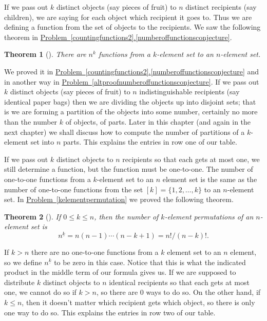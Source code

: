 \documentclass[10pt,]{book}
\theoremstyle{plain}
\newtheorem{theorem}{Theorem}[section]
\theoremstyle{definition}
\theoremstyle{definition}
\numberwithin{equation}{chapter}
\begin{document}
\par
If we pass out \(k\) distinct objects (say pieces of fruit) to \(n\) distinct recipients (say children), we are saying for each object which recipient it goes to. Thus we are defining a function from the set of objects to the recipients. We saw the following theorem in \hyperref[numberoffunctionsconjecture]{Problem~\ref{countingfunctions2}.\ref{numberoffunctionsconjecture}}.%
\begin{theorem}[{}]\label{theorem-3}
There are \(n^k\) functions from a \(k\)-element set to an \(n\)-element set.%
\end{theorem}
We proved it in \hyperref[numberoffunctionsconjecture]{Problem~\ref{countingfunctions2}.\ref{numberoffunctionsconjecture}} and in another way in \hyperref[altproofnumberoffunctionsconjecture]{Problem~\ref{altproofnumberoffunctionsconjecture}}. If we pass out \(k\) distinct objects (say pieces of fruit) to \(n\) indistinguishable recipients (say identical paper bags) then we are dividing the objects up into disjoint sets; that is we are forming a partition of the objects into some number, certainly no more than the number \(k\) of objects, of parts. Later in this chapter (and again in the next chapter) we shall discuss how to compute the number of partitions of a \(k\)-element set into \(n\) parts. This explains the entries in row one of our table.%
\par
If we pass out \(k\) distinct objects to \(n\) recipients so that each gets at most one, we still determine a function, but the function must be one-to-one. The number of one-to-one functions from a \(k\)-element set to an \(n\) element set is the same as the number of one-to-one functions from the set \([k] =\{1,2,\ldots,k\}\) to an \(n\)-element set. In \hyperref[kelementpermutation]{Problem~\ref{kelementpermutation}} we proved the following theorem.%
\begin{theorem}[{}]\label{numberofinjections}
If \(0\le k\le n\), then the number of \(k\)-element permutations of an \(n\)-element set is%
\begin{equation*}
n^{\underline{k}} = n(n-1)\cdots(n-k+1) =
n!/(n-k)!.
\end{equation*}
%
\par
{}%
\end{theorem}
If \(k>n\) there are no one-to-one functions from a \(k\) element set to an \(n\) element, so we define \(n^{\underline{k}}\) to be zero in this case. Notice that this is what the indicated product in the middle term of our formula gives us. If we are supposed to distribute \(k\) distinct objects to \(n\) identical recipients so that each gets at most one, we cannot do so if \(k>n\), so there are 0 ways to do so. On the other hand, if \(k\le n\), then it doesn't matter which recipient gets which object, so there is only one way to do so. This explains the entries in row two of our table.%
\end{document}
